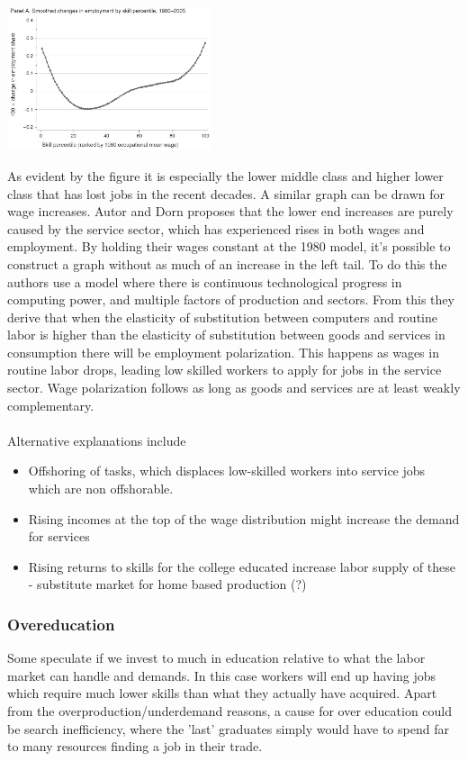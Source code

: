 \documentclass[12pt, a4paper]{article}
\begin{document}
\begin{multicols}{2}
\includegraphics[width = 0.45\textwidth]{empl.jpg}

As evident by the figure it is especially the lower middle class and higher lower class that has lost jobs in the recent decades. A similar graph can be drawn for wage increases. Autor and Dorn proposes that the lower end increases are purely caused by the service sector, which has experienced rises in both wages and employment. By holding their wages constant at the 1980 model, it's possible to construct a graph without as much of an increase in the left tail. To do this the authors use a model where there is continuous technological progress in computing power, and multiple factors of production and sectors. From this they derive that when the elasticity of substitution between computers and routine labor is higher than the elasticity of substitution between goods and services in consumption there will be employment polarization. This happens as wages in routine labor drops, leading low skilled workers to apply for jobs in the service sector. Wage polarization follows as long as goods and services are at least weakly complementary.
\\ \\
Alternative explanations include
\begin{itemize}
\item Offshoring of tasks, which displaces low-skilled workers into service jobs which are non offshorable.
\item Rising incomes at the top of the wage distribution might increase the demand for services
\item Rising returns to skills for the college educated increase labor supply of these - substitute market for home based production (?)
\end{itemize}

\subsubsection{Overeducation}
Some speculate if we invest to much in education relative to what the labor market can handle and demands. In this case workers will end up having jobs which require much lower skills than what they actually have acquired. Apart from the overproduction/underdemand reasons, a cause for over education could be search inefficiency, where the 'last' graduates simply would have to spend far to many resources finding a job in their trade.


\end{multicols}
\end{document}
